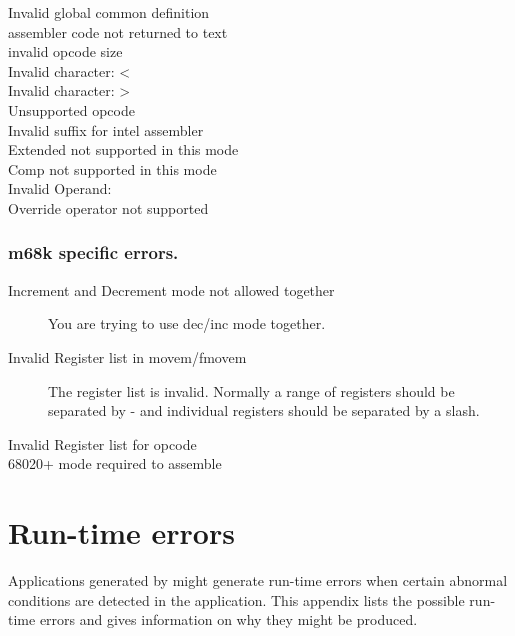 \begin{description}
\item [ Invalid global common definition ]
\item [ assembler code not returned to text ]
\item [ invalid opcode size ]
\item [ Invalid character: < ]
\item [ Invalid character: > ]
\item [ Unsupported opcode ]
\item [ Invalid suffix for intel assembler ]
\item [ Extended not supported in this mode ]
\item [ Comp not supported in this mode ]
\item [ Invalid Operand: ]
\item [ Override operator not supported ]
\end{description}

\subsection{m68k specific errors.}
\begin{description}
\item [Increment and Decrement mode not allowed together]
You are trying to use dec/inc mode together.

\item [Invalid Register list in movem/fmovem]
The register list is invalid. Normally a range of registers should
be separated by - and individual registers should be separated by
a slash.
\item [Invalid Register list for opcode]
\item [68020+ mode required to assemble]
\end{description}

\chapter{Run-time errors}

Applications generated  by \fpc might generate run-time errors when certain
abnormal conditions are detected in the application. This appendix lists the
possible run-time errors and gives information on why they might be produced.

